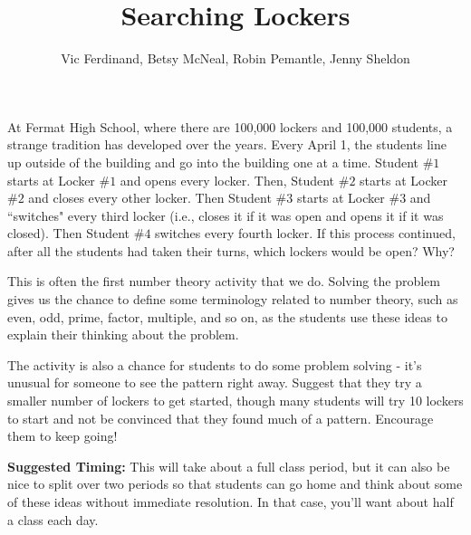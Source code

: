 \documentclass{ximera}
\title{Searching Lockers}
\author{Vic Ferdinand, Betsy McNeal, Robin Pemantle, Jenny Sheldon}
\begin{document}
\begin{abstract} \end{abstract}
\maketitle


\begin{problem}
At Fermat High School, where there are 100,000 lockers and 100,000 students, a strange tradition has developed over the years.  Every April 1, the students line up outside of the building and go into the building one at a time.  Student $\#1$ starts at Locker $\#1$ and opens every locker.  Then, Student $\#2$ starts at Locker $\#2$  and closes every other locker.  Then Student $\#3$ starts at Locker $\#3$ and ``switches" every third locker (i.e., closes it if it was open and opens it if it was closed).  Then Student $\#4$ switches every fourth locker.  If this process continued, after all the students had taken their turns, which lockers would be open?  Why?
\end{problem}
\newpage

\begin{instructorNotes}
This is often the first number theory activity that we do.  Solving the problem gives us the chance to define some terminology related to number theory, such as even, odd, prime, factor, multiple, and so on, as the students use these ideas to explain their thinking about the problem.

The activity is also a chance for students to do some problem solving - it's unusual for someone to see the pattern right away.  Suggest that they try a smaller number of lockers to get started, though many students will try 10 lockers to start and not be convinced that they found much of a pattern.  Encourage them to keep going!

{\bf Suggested Timing:} This will take about a full class period, but it can also be nice to split over two periods so that students can go home and think about some of these ideas without immediate resolution.  In that case, you'll want about half a class each day.
\end{instructorNotes}
\end{document}
